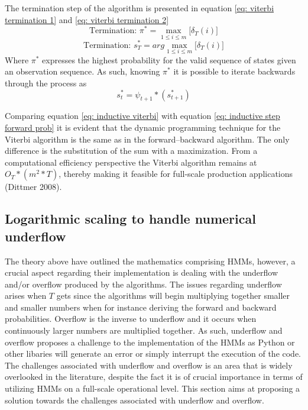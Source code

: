 The termination step of the algorithm is presented in equation \ref{eq: viterbi termination 1} and \ref{eq: viterbi termination 2}
\begin{equation}
    \text{Termination: } \pi^* = \max_{1\leq i\leq m}\Big[\delta_T(i)\Big] 
    \label{eq: viterbi termination 1}
\end{equation}
 \begin{equation}
     \text{Termination: } s_T^*= arg\max_{1\leq i\leq m}\Big[\delta_T(i)\Big]
     \label{eq: viterbi termination 2}
 \end{equation}
Where $\pi^*$ expresses the highest probability for the valid sequence of states given an observation sequence. As such, knowing $\pi^*$ it is possible to iterate backwards through the process as
\begin{equation}
    s_t^* = \psi_{t+1}*(s_{t+1}^*)
\end{equation}

Comparing equation \ref{eq: inductive viterbi} with equation \ref{eq: inductive step forward prob} it is evident that the dynamic programming technique for the Viterbi algorithm is the same as in the forward–backward
algorithm. The only difference is the substitution of the sum with a maximization. From a computational efficiency perspective the Viterbi algorithm remains at $O_T*(m^2*T)$, thereby making it feasible for full-scale production applications (Dittmer 2008).

\subsection{Logarithmic scaling to handle numerical underflow}
The theory above have outlined the mathematics comprising HMMs, however, a crucial aspect regarding their implementation is dealing with the underflow and/or overflow produced by the algorithms. The issues regarding underflow arises when $T$ gets since the algorithms will begin multiplying together smaller and smaller numbers when for instance deriving the forward and backward probabilities. Overflow is the inverse to underflow and it occurs when continuously larger numbers are multiplied together. As such, underflow and overflow proposes a challenge to the implementation of the HMMs as Python or other libaries will generate an error or simply interrupt the execution of the code. The challenges associated with underflow and overflow is an area that is widely overlooked in the literature, despite the fact it is of crucial importance in terms of utilizing HMMs on a full-scale operational level. This section aims at proposing a solution towards the challenges associated with underflow and overflow.

